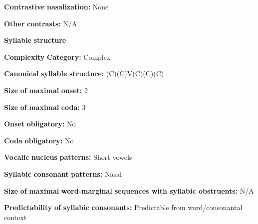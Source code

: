 \begin{styleBody}
\textbf{Contrastive} \textbf{nasalization:} None
\end{styleBody}

\begin{styleBody}
\textbf{Other} \textbf{contrasts:} N/A
\end{styleBody}

\begin{styleBody}
\textbf{Syllable} \textbf{structure}
\end{styleBody}

\begin{styleBody}
\textbf{Complexity} \textbf{Category:} Complex
\end{styleBody}

\begin{styleBody}
\textbf{Canonical} \textbf{syllable} \textbf{structure:} (C)(C)V(C)(C)(C) \citep[80-4]{Georg2007}
\end{styleBody}

\begin{styleBody}
\textbf{Size} \textbf{of} \textbf{maximal} \textbf{onset:} 2
\end{styleBody}

\begin{styleBody}
\textbf{Size} \textbf{of} \textbf{maximal} \textbf{coda:} 3
\end{styleBody}

\begin{styleBody}
\textbf{Onset} \textbf{obligatory:} No
\end{styleBody}

\begin{styleBody}
\textbf{Coda} \textbf{obligatory:} No
\end{styleBody}

\begin{styleBody}
\textbf{Vocalic} \textbf{nucleus} \textbf{patterns:} Short vowels
\end{styleBody}

\begin{styleBody}
\textbf{Syllabic} \textbf{consonant} \textbf{patterns:} Nasal
\end{styleBody}

\begin{styleBody}
\textbf{Size} \textbf{of} \textbf{maximal} \textbf{word{}-marginal sequences with syllabic obstruents:} N/A
\end{styleBody}

\begin{styleBody}
\textbf{Predictability} \textbf{of} \textbf{syllabic} \textbf{consonants:} Predictable from word/consonantal context
\end{styleBody}

